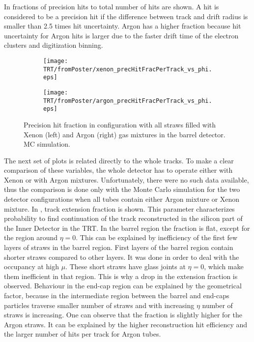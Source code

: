 In  fractions of precision hits to total number of hits are shown. A hit is considered to be a precision
hit if the difference between track and drift radius is smaller than 2.5 times hit uncertainty. Argon has a higher fraction because hit uncertainty
for Argon hits is larger due to the faster drift time of the electron clusters and digitization binning. 

\begin{figure}

\begin{subfigure}{.5\textwidth}
  \centering
  \texttt{[image: TRT/fromPoster/xenon\_precHitFracPerTrack\_vs\_phi.eps]}
\end{subfigure}%
\begin{subfigure}{.5\textwidth}
  \centering
  \texttt{[image: TRT/fromPoster/argon\_precHitFracPerTrack\_vs\_phi.eps]}
\end{subfigure}

\caption{Precision hit fraction in configuration with all straws filled with Xenon (left) and Argon (right) gas mixtures in the barrel detector. MC simulation.}
  \label{fig:precHitFracPerTrack}
\end{figure}

The next set of plots is related directly to the whole tracks. To make a clear comparison of these variables, the whole detector has to operate either with Xenon or with Argon mixtures.
Unfortunately, there were no such data available, thus the comparison is done only with the Monte Carlo simulation for the two detector configurations when 
all tubes contain either Argon mixture or Xenon mixture. In , track extension fraction is shown. This parameter characterizes
probability to find continuation of the track reconstructed in the silicon part of the Inner Detector in the TRT.
In the barrel region the fraction is flat, except for the region around $\eta = 0$. This can be explained by inefficiency of the first few layers of straws in the barrel region.
First layers of the barrel region contain shorter straws compared to other layers. It was done in order to deal with the occupancy at high $\mu$.
These short straws have glass joints at $\eta = 0$, which make them inefficient in that region. This is why a drop in the extension fraction is observed.
Behaviour in the end-cap region can be explained by the geometrical factor, because in the intermediate region between the barrel and end-caps particles
traverse smaller number of straws and with increasing $\eta$ number of straws is increasing.
One can observe that the fraction is slightly higher for the Argon straws. It can be explained by the higher reconstruction hit efficiency and the larger number of hits per
track for Argon tubes.

